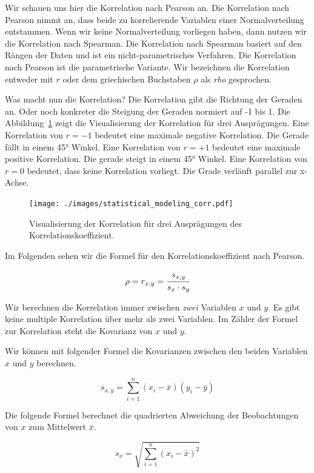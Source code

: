 \documentclass[
  letterpaper,
]{scrbook}
\begin{document}
Wir schauen uns hier die Korrelation nach Pearson an. Die Korrelation
nach Pearson nimmt an, dass beide zu korrelierende Variablen einer
Normalverteilung entstammen. Wenn wir keine Normalverteilung vorliegen
haben, dann nutzen wir die Korrelation nach Spearman. Die Korrelation
nach Spearman basiert auf den Rängen der Daten und ist ein
nicht-parametrisches Verfahren. Die Korrelation nach Pearson ist die
parametrische Variante. Wir bezeichnen die Korrelation entweder mit
\(r\) oder dem griechischen Buchstaben \(\rho\) als \emph{rho}
gesprochen.

Was macht nun die Korrelation? Die Korrelation gibt die Richtung der
Geraden an. Oder noch konkreter die Steigung der Geraden normiert auf -1
bis 1. Die Abbildung~\ref{fig-corr1} zeigt die Visualisierung der
Korrelation für drei Ausprägungen. Eine Korrelation von \(r = -1\)
bedeutet eine maximale negative Korrelation. Die Gerade fällt in einem
45° Winkel. Eine Korrelation von \(r = +1\) bedeutet eine maximale
positive Korrelation. Die gerade steigt in einem 45° Winkel. Eine
Korrelation von \(r = 0\) bedeutet, dass keine Korrelation vorliegt. Die
Grade verläuft parallel zur x-Achse.

\begin{figure}

{\centering \texttt{[image: ./images/statistical\_modeling\_corr.pdf]}

}

\caption{\label{fig-corr1}Visualisierung der Korrelation für drei
Ausprägungen des Korrelationskoeffizient.}

\end{figure}

Im Folgenden sehen wir die Formel für den Korrelationskoeffizient nach
Pearson.

\[
\rho = r_{x,y} = \cfrac{s_{x,y}}{s_x \cdot s_y}
\]

Wir berechnen die Korrelation immer zwischen \emph{zwei} Variablen \(x\)
und \(y\). Es gibt keine multiple Korrelation über mehr als zwei
Variablen. Im Zähler der Formel zur Korrelation steht die Kovarianz von
\(x\) und \(y\).

Wir können mit folgender Formel die Kovarianzen zwischen den beiden
Variablen \(x\) und \(y\) berechnen.

\[
s_{x,y} = \sum_{i=1}^n(x_i-\bar{x})(y_i-\bar{y})
\]

Die folgende Formel berechnet die quadrierten Abweichung der
Beobachtungen von \(x\) zum Mittelwert \(\bar{x}\).

\[
s_x = \sqrt{\sum_{i=1}^n(x_i-\bar{x})^2}
\]
\end{document}
